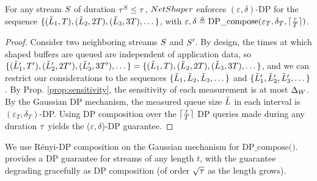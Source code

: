 \begin{proposition}\label{prop:dp}
For any stream $S$ of duration $\tau^S \leq
\tau$, {${NetShaper}$}
enforces $(\varepsilon, \delta)$-DP for the sequence $\{(\tilde{L}_1, T),
(\tilde{L}_2, 2T), (\tilde{L}_3, 3T), \dots \}$, with $\varepsilon, \delta
\triangleq \textrm{DP\_compose}(\varepsilon_T, \delta_T, \lceil
\frac{\tau}{T} \rceil)$.
\end{proposition}

\begin{proof}
Consider two neighboring streams $S$ and $S'$. By design, the
times at which shaped buffers are queued are independent of application data, so
$\{(\tilde{L}'_1, T'), (\tilde{L}'_2, 2T'), (\tilde{L}'_3, 3T'), \dots \} =
\{(\tilde{L}_1, T), (\tilde{L}_2, 2T), (\tilde{L}_3, 3T), \dots \}$, and we can
restrict our considerations to the sequences $\{\tilde{L}_1, \tilde{L}_2, \tilde{L}_3,
\dots \}$ and $\{\tilde{L}'_1, \tilde{L}'_2, \tilde{L}'_3, \dots \}$.
By Prop. \ref{prop:sensitivity}, the sensitivity of each measurement is at most
 $\Delta_{W}$.
By the Gaussian DP mechanism, the measured queue size $\tilde{L}$ in each
interval is $(\varepsilon_{T}, \delta_{T})$-DP.
Using DP composition over the $\lceil \frac{\tau}{T}
\rceil$ DP queries made during any duration $\tau$
 yields the ($\varepsilon, \delta$)-DP guarantee.
\end{proof}
We use R\'enyi-DP composition on the Gaussian mechanism for
$\textrm{DP\_compose()}$. {\sys} provides a DP guarantee for streams of any
length $t$, with the guarantee degrading gracefully as DP composition (of
order $\sqrt{\tau}$ as the length grows).


